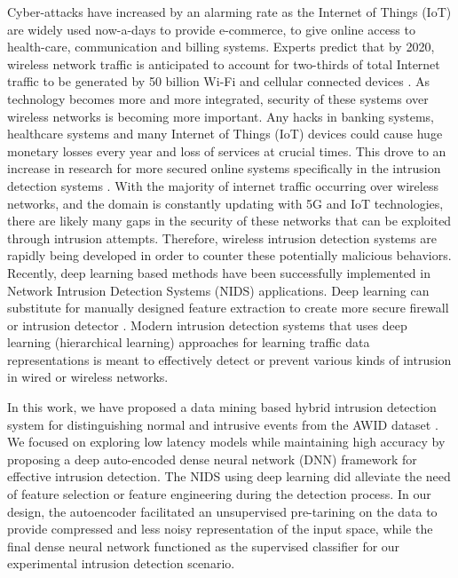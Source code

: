 \documentclass[letterpaper, 10pt, conference]{ieeeconf} %
\begin{document}
 Cyber-attacks have increased by an alarming rate as the Internet of Things (IoT) are widely used now-a-days to provide e-commerce, to give online access to health-care, communication and billing systems. Experts predict that by 2020, wireless network traffic is anticipated to account for two-thirds of total Internet traffic to be generated by 50 billion  Wi-Fi and cellular connected devices \cite{Shone2018}. As technology becomes more and more integrated, security of these systems over wireless networks is becoming more important. Any hacks in banking systems, healthcare systems and many Internet of Things (IoT) devices could cause huge monetary losses every year and loss of services at crucial times.  This drove to an increase in research for more secured online systems specifically in the intrusion detection systems \cite{kolias2017, aminanto2018deep,alotaibi2016majority}. With the majority of internet traffic occurring over wireless networks, and the domain is constantly updating with 5G and IoT technologies, there are likely many gaps in the security of these networks that can be exploited through intrusion attempts. Therefore, wireless intrusion detection
systems are rapidly being developed in order to counter these potentially malicious behaviors.  Recently, deep learning based methods have been successfully implemented in Network Intrusion Detection Systems (NIDS) applications. Deep learning can substitute for manually designed feature extraction to create more secure firewall or intrusion detector \cite{ref:survey18}. Modern intrusion detection systems that uses deep learning (hierarchical learning) approaches for learning traffic data representations is meant to effectively detect or prevent various kinds of intrusion in wired or wireless networks.
 
 In this work, we have proposed a data mining based hybrid intrusion detection system for distinguishing normal and intrusive events from the AWID dataset \cite{AWID}. We focused on exploring low latency models  while  maintaining  high  accuracy  by  proposing a deep auto-encoded dense neural network (DNN) framework for effective intrusion detection. The NIDS using deep learning did alleviate the need of feature selection or feature engineering during the detection process.  In our design, the autoencoder facilitated an unsupervised pre-tarining on the data to provide compressed and less noisy representation of the input space, while the final dense neural network functioned as the supervised classifier for our experimental intrusion detection scenario.
\end{document}
